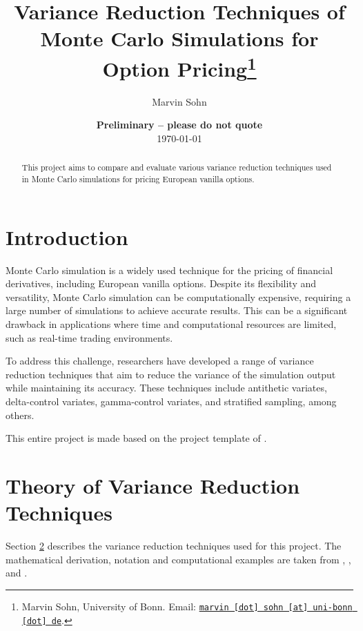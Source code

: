 \documentclass[11pt, a4paper, leqno]{article}
\begin{document}
\title{Variance Reduction Techniques of Monte Carlo Simulations for Option Pricing\thanks{Marvin Sohn, University of Bonn. Email: \href{mailto:marvin.sohn@uni-bonn.de}{\nolinkurl{marvin [dot] sohn [at] uni-bonn [dot] de}}.}}

\author{Marvin Sohn}

\date{
    {\bf Preliminary -- please do not quote}
    \\[1ex]
    \today
}

\maketitle


\begin{abstract}
    This project aims to compare and evaluate various variance reduction techniques used in Monte Carlo simulations for pricing European vanilla options.
\end{abstract}

\clearpage


\section{Introduction} %
\label{sec:introduction}

Monte Carlo simulation is a widely used technique for the pricing of financial derivatives, including European vanilla options. Despite its flexibility and versatility, Monte Carlo simulation can be computationally expensive, requiring a large number of simulations to achieve accurate results. This can be a significant drawback in applications where time and computational resources are limited, such as real-time trading environments.

To address this challenge, researchers have developed a range of variance reduction techniques that aim to reduce the variance of the simulation output while maintaining its accuracy. These techniques include antithetic variates, delta-control variates, gamma-control variates, and stratified sampling, among others.

This entire project is made based on the project template of \cite{GaudeckerEconProjectTemplates}.
\section{Theory of Variance Reduction Techniques}\label{sec:var_reduc_techniques}

Section \ref{sec:var_reduc_techniques} describes the variance reduction techniques used for this project. The mathematical derivation, notation and computational examples are taken from \cite{Glassermann:2004}, \cite{Hilpisch:2015}, and \cite{Clewlow:1998}.
\end{document}
